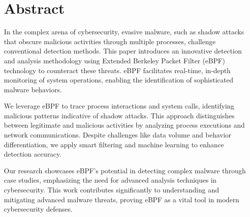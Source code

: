 
\section*{Abstract}
In the complex arena of cybersecurity, evasive malware,
such as shadow attacks that obscure malicious activities
through multiple processes, challenge conventional detection methods.
This paper introduces an innovative detection and analysis methodology
using Extended Berkeley Packet Filter (eBPF) technology to counteract these threats.
eBPF facilitates real-time, in-depth monitoring of system operations,
enabling the identification of sophisticated malware behaviors.

We leverage eBPF to trace process interactions and system calls,
identifying malicious patterns indicative of shadow attacks.
This approach distinguishes between legitimate and malicious activities
by analyzing process executions and network communications.
Despite challenges like data volume and behavior differentiation,
we apply smart filtering and machine learning to enhance detection accuracy.

Our research showcases eBPF's potential in detecting complex malware
through case studies, emphasizing the need for advanced analysis techniques
in cybersecurity.
This work contributes significantly to understanding and mitigating advanced malware threats,
proving eBPF as a vital tool in modern cybersecurity defenses.

